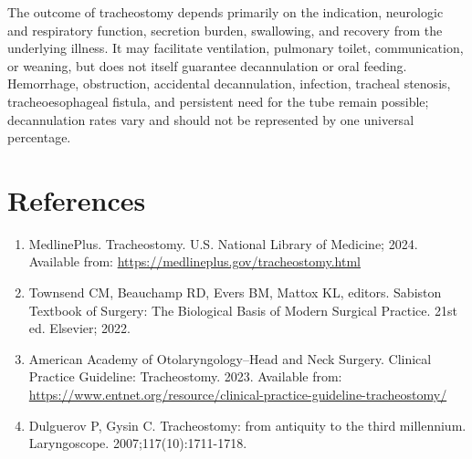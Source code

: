 The outcome of tracheostomy depends primarily on the indication, neurologic and respiratory function, secretion burden, swallowing, and recovery from the underlying illness. It may facilitate ventilation, pulmonary toilet, communication, or weaning, but does not itself guarantee decannulation or oral feeding. Hemorrhage, obstruction, accidental decannulation, infection, tracheal stenosis, tracheoesophageal fistula, and persistent need for the tube remain possible; decannulation rates vary and should not be represented by one universal percentage.

\section*{References}
\begin{enumerate}
  \item MedlinePlus. Tracheostomy. U.S. National Library of Medicine; 2024. Available from: \url{https://medlineplus.gov/tracheostomy.html}
  
  \item Townsend CM, Beauchamp RD, Evers BM, Mattox KL, editors. Sabiston Textbook of Surgery: The Biological Basis of Modern Surgical Practice. 21st ed. Elsevier; 2022.

  \item American Academy of Otolaryngology--Head and Neck Surgery. Clinical Practice Guideline: Tracheostomy. 2023. Available from: \url{https://www.entnet.org/resource/clinical-practice-guideline-tracheostomy/}

  \item Dulguerov P, Gysin C. Tracheostomy: from antiquity to the third millennium. Laryngoscope. 2007;117(10):1711-1718.
\end{enumerate}

\clearpage
